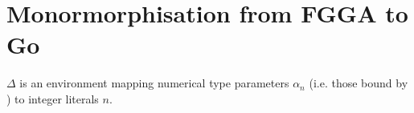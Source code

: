 \section{Monormorphisation from FGGA to Go}

$\Delta$ is an environment mapping numerical type parameters $\alpha_n$ (i.e.
those bound by ) to integer literals $n$.





